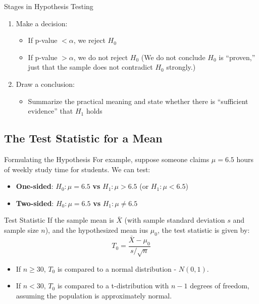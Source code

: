 \documentclass[10pt, total={6in, 8in}]{extarticle}
\begin{document}
\begin{conceptbox}{Stages in Hypothesis Testing}{}
\begin{enumerate}
        \item  Make a decision:
              \begin{itemize}
                  \item If p-value $< \alpha$, we reject $H_0$
                  \item If p-value $ > \alpha$, we do not reject $H_0$ (We do not conclude $H_0$ is “proven,” just that the sample does not contradict $H_0$ strongly.)
              \end{itemize}
        \item Draw a conclusion:
              \begin{itemize}
                  \item Summarize the practical meaning and state whether there is “sufficient evidence” that $H_1$ holds
              \end{itemize}
    \end{enumerate}
\end{conceptbox}


\subsection{The Test Statistic for a Mean}
\begin{conceptbox}{Formulating the Hypothesis}{}
    For example, suppose someone claims $\mu = 6.5$ hours of weekly study time for students. We can test:
    \begin{itemize}
        \item \textbf{One-sided}: $H_0: \mu = 6.5$ \textbf{vs} $H_1: \mu > 6.5$ (or $H_1: \mu < 6.5$)
        \item \textbf{Two-sided}: $H_0: \mu = 6.5$ \textbf{vs} $H_1: \mu \neq 6.5$
    \end{itemize}
\end{conceptbox}



\begin{definitionbox}{Test Statistic}{}
    If the sample mean is $\bar{X}$ (with sample standard deviation $s$ and sample size $n$), and the hypothesized mean ius $\mu_0$, the test statistic is given by:
    $$T_0 = \frac{\bar{X} - \mu_0}{s/\sqrt{n}}$$
    \begin{itemize}
        \item If $n \geq 30$,  $T_0$ is compared to a normal distribution - $N(0, 1)$.
        \item If $n < 30$, $T_0$ is compared to a t-distribution with $n-1$ degrees of freedom, assuming the population is approximately normal.
    \end{itemize}
\end{definitionbox}
\end{document}
